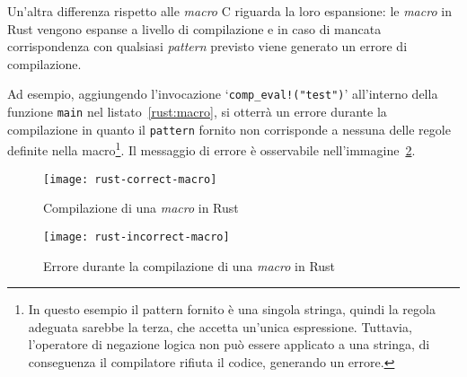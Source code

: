 Un'altra differenza rispetto alle \textit{macro} C riguarda la loro espansione: le \textit{macro} in Rust vengono espanse a livello di compilazione e in caso di mancata
corrispondenza con qualsiasi \textit{pattern} previsto viene generato un errore di compilazione.

Ad esempio, aggiungendo l'invocazione `\texttt{comp\_eval!("test")}' all'interno della funzione \texttt{main} nel listato~\ref{rust:macro}, si otterrà un errore
durante la compilazione in quanto il \texttt{pattern} fornito non corrisponde a nessuna delle regole definite nella macro\footnote{In questo esempio il pattern fornito è una singola stringa, quindi la regola adeguata sarebbe la terza, che accetta un'unica espressione. Tuttavia, l'operatore di negazione logica non può essere applicato a una stringa, di conseguenza il compilatore rifiuta il codice, generando un errore.}.
Il messaggio di errore è osservabile nell'immagine~\ref{rust:incorrect-macro}.
\begin{figure}[htbp]
    \begin{center}
        \texttt{[image: rust-correct-macro]}
        \caption{Compilazione di una \textit{macro} in Rust}\label{rust:correct-macro}
    \end{center}
\end{figure}
\begin{figure}[htbp]
    \begin{center}
        \texttt{[image: rust-incorrect-macro]}
        \caption{Errore durante la compilazione di una \textit{macro} in Rust}\label{rust:incorrect-macro}
    \end{center}
\end{figure}